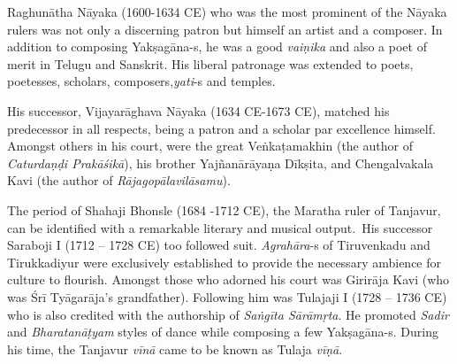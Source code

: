 
Raghunātha Nāyaka (1600-1634 CE) who was the most prominent of the Nāyaka rulers was not only a discerning patron but himself an artist and a composer. In addition to composing Yakṣagāna-s, he was a good \textit{vaiṇika} and also a poet of merit in Telugu and Sanskrit. His liberal patronage was extended to poets, poetesses, scholars, composers,\break \textit{yati}-s and temples.


His successor, Vijayarāghava Nāyaka (1634 CE-1673 CE), matched his predecessor in all respects, being a patron and a scholar par excellence himself. Amongst others in his court, were the great Veṅkaṭamakhin (the author of \textit{Caturdaṇḍi Prakāśikā}), his brother Yajñanārāyaṇa Dīkṣita, and Chengalvakala Kavi (the author of \textit{Rājagopālavilāsamu}).


The period of Shahaji Bhonsle (1684 -1712 CE), the Maratha ruler of Tanjavur, can be identified with a remarkable literary and musical output.~His successor Saraboji I (1712 – 1728 CE) too followed suit. \textit{Agrahāra}-s of Tiruvenkadu and Tirukkadiyur were exclusively established to provide the necessary ambience for culture to flourish. Amongst those who adorned his court was Girirāja Kavi (who was Śrī Tyāgarāja’s grandfather). Following him was Tulajaji I (1728 – 1736 CE) who is also credited with the authorship of \textit{Saṅgīta Sārāmṛta}. He promoted \textit{Sadir} and \textit{Bharatanāṭyam} styles of dance while composing a few Yakṣagāna-s. During his time, the Tanjavur \textit{vīnā} came to be known as Tulaja \textit{vīṇā}.


